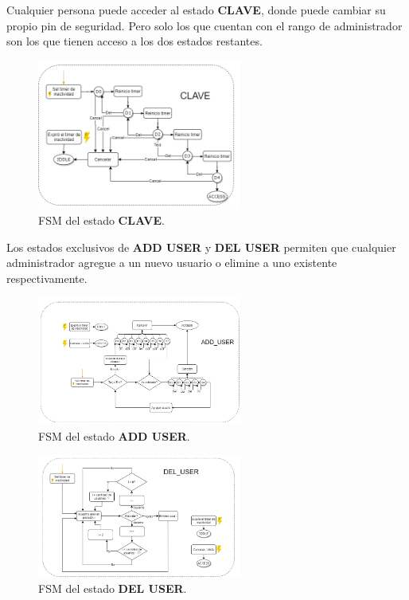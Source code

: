 Cualquier persona puede acceder al estado \textbf{CLAVE}, donde puede cambiar su propio pin de seguridad. Pero solo los que cuentan con el rango de administrador son los que tienen acceso a los dos estados restantes. 

\begin{figure}[H]
\centering
	\includegraphics[width=0.6\textwidth]{ImagenesEjercicio2/clave.png}
	\caption{FSM del estado \textbf{CLAVE}.}
	\label{fig:clave}
\end{figure}

Los estados exclusivos de \textbf{ADD USER} y \textbf{DEL USER} permiten que cualquier administrador agregue a un nuevo usuario o elimine a uno existente respectivamente.

\begin{figure}[H]
\centering
	\includegraphics[width=0.6\textwidth]{ImagenesEjercicio2/adduser.png}
	\caption{FSM del estado \textbf{ADD USER}.}
	\label{fig:adduser}
\end{figure}

\begin{figure}[H]
\centering
	\includegraphics[width=0.6\textwidth]{ImagenesEjercicio2/deluser.png}
	\caption{FSM del estado \textbf{DEL USER}.}
	\label{fig:deluser}
\end{figure}